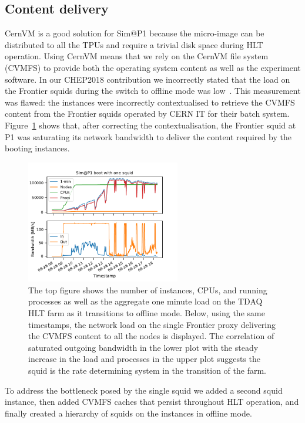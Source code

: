 \documentclass{webofc}
\begin{document}
\subsection{Content delivery}
CernVM is a good solution for Sim@P1 because the micro-image can be distributed
to all the TPUs and require a trivial disk space during HLT operation. Using
CernVM means that we rely on the CernVM file system (CVMFS) to provide both the
operating system content as well as the experiment software. In our CHEP2018
contribution we incorrectly stated that the load on the Frontier squids during
the switch to offline mode was low~\cite{Berghaus:2019wuj, Dykstra:2019}.
This measurement was flawed: the instances were incorrectly contextualised to
retrieve the CVMFS content from the Frontier squids operated by CERN IT for
their batch system. Figure~\ref{fig:single_proxy} shows that, after correcting
the contextualisation, the Frontier squid at P1 was saturating its network
bandwidth to deliver the content required by the booting instances.
\begin{figure}[h]
\centering
\sidecaption
\includegraphics[width=0.6\textwidth,clip]{single_squid}
\caption{The top figure shows the number of instances, CPUs, and running
processes as well as the aggregate one minute load on the TDAQ HLT farm as it
transitions to offline mode. Below, using the same timestamps, the network load
on the single Frontier proxy delivering the CVMFS content to all the nodes is
displayed. The correlation of saturated outgoing bandwidth in the lower plot
with
the steady increase in the load and processes in the upper plot suggests the
squid is the rate determining system in the transition of the farm.}
\label{fig:single_proxy}
\end{figure}
To address the bottleneck posed by the single squid we added a second squid
instance, then added CVMFS caches that persist throughout HLT operation, and
finally created a hierarchy of squids on the instances in offline mode.
\end{document}
